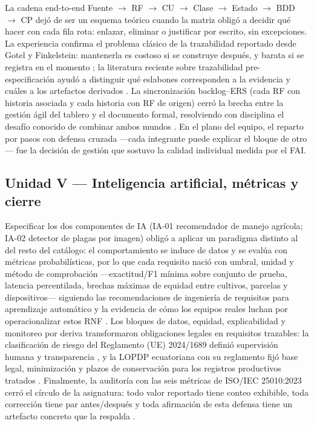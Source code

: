 La cadena end-to-end Fuente $\rightarrow$ RF $\rightarrow$ CU $\rightarrow$ Clase $\rightarrow$ Estado $\rightarrow$ BDD $\rightarrow$ CP dej\'o de ser un esquema te\'orico cuando la matriz oblig\'o a decidir qu\'e hacer con cada fila rota: enlazar, eliminar o justificar por escrito, sin excepciones. La experiencia confirma el problema cl\'asico de la trazabilidad reportado desde Gotel y Finkelstein: mantenerla es costoso si se construye despu\'es, y barata si se registra en el momento \cite{gotel1994}; la literatura reciente sobre trazabilidad pre-especificaci\'on ayud\'o a distinguir qu\'e eslabones corresponden a la evidencia y cu\'ales a los artefactos derivados \cite{mucha2024}. La sincronizaci\'on backlog--ERS (cada RF con historia asociada y cada historia con RF de origen) cerr\'o la brecha entre la gesti\'on \'agil del tablero y el documento formal, resolviendo con disciplina el desaf\'io conocido de combinar ambos mundos \cite{hoyxu2023}. En el plano del equipo, el reparto por pasos con defensa cruzada ---cada integrante puede explicar el bloque de otro--- fue la decisi\'on de gesti\'on que sostuvo la calidad individual medida por el FAI.

\subsection*{Unidad V --- Inteligencia artificial, m\'etricas y cierre}

Especificar los dos componentes de IA (IA-01 recomendador de manejo agr\'icola; IA-02 detector de plagas por imagen) oblig\'o a aplicar un paradigma distinto al del resto del cat\'alogo: el comportamiento se induce de datos y se eval\'ua con m\'etricas probabil\'isticas, por lo que cada requisito naci\'o con umbral, unidad y m\'etodo de comprobaci\'on ---exactitud/F1 m\'inima sobre conjunto de prueba, latencia percentilada, brechas m\'aximas de equidad entre cultivos, parcelas y dispositivos--- siguiendo las recomendaciones de ingenier\'ia de requisitos para aprendizaje autom\'atico \cite{vogelsang2019} y la evidencia de c\'omo los equipos reales luchan por operacionalizar estos RNF \cite{habibullah2023,ahmad2023}. Los bloques de datos, equidad, explicabilidad y monitoreo por deriva transformaron obligaciones legales en requisitos trazables: la clasificaci\'on de riesgo del Reglamento (UE) 2024/1689 defini\'o supervisi\'on humana y transparencia \cite{eu20241689}, y la LOPDP ecuatoriana con su reglamento fij\'o base legal, minimizaci\'on y plazos de conservaci\'on para los registros productivos tratados \cite{lopdp2021,decreto904}. Finalmente, la auditor\'ia con las seis m\'etricas de ISO/IEC 25010:2023 cerr\'o el c\'irculo de la asignatura: todo valor reportado tiene conteo exhibible, toda correcci\'on tiene par antes/despu\'es y toda afirmaci\'on de esta defensa tiene un artefacto concreto que la respalda \cite{iso25010}.
